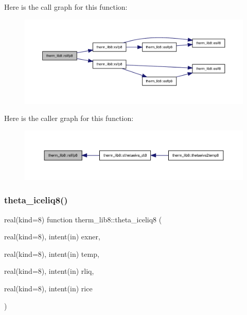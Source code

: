 Here is the call graph for this function\+:
\nopagebreak
\begin{figure}[H]
\begin{center}
\leavevmode
\includegraphics[width=350pt]{namespacetherm__lib8_ab015aacbfd2ec939e27197d7477f09a7_cgraph}
\end{center}
\end{figure}
Here is the caller graph for this function\+:
\nopagebreak
\begin{figure}[H]
\begin{center}
\leavevmode
\includegraphics[width=350pt]{namespacetherm__lib8_ab015aacbfd2ec939e27197d7477f09a7_icgraph}
\end{center}
\end{figure}
\mbox{\label{namespacetherm__lib8_a7d5573528d5f5adeb9beb594eead7f4f}} 
\subsubsection{\texorpdfstring{theta\+\_\+iceliq8()}{theta\_iceliq8()}}
{\footnotesize\ttfamily real(kind=8) function therm\+\_\+lib8\+::theta\+\_\+iceliq8 (\begin{DoxyParamCaption}\item[{real(kind=8), intent(in)}]{exner,  }\item[{real(kind=8), intent(in)}]{temp,  }\item[{real(kind=8), intent(in)}]{rliq,  }\item[{real(kind=8), intent(in)}]{rice }\end{DoxyParamCaption})}

